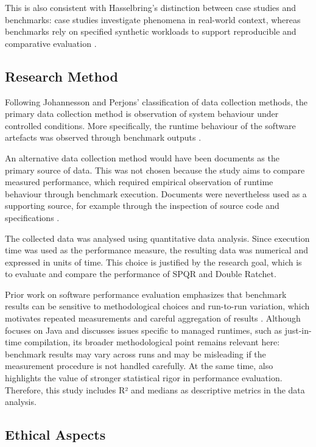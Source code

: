 This is also consistent with Hasselbring's distinction between case studies and benchmarks: case studies investigate phenomena in real-world context, whereas benchmarks rely on specified synthetic workloads to support reproducible and comparative evaluation \cite{ref22}.

\subsection{Research Method}

Following Johannesson and Perjons' classification of data collection methods, the primary data collection method is observation of system behaviour under controlled conditions. More specifically, the runtime behaviour of the software artefacts was observed through benchmark outputs \cite{ref21}.

An alternative data collection method would have been documents as the primary source of data. This was not chosen because the study aims to compare measured performance, which required empirical observation of runtime behaviour through benchmark execution. Documents were nevertheless used as a supporting source, for example through the inspection of source code and specifications \cite{ref21}.

The collected data was analysed using quantitative data analysis. Since execution time was used as the performance measure, the resulting data was numerical and expressed in units of time. This choice is justified by the research goal, which is to evaluate and compare the performance of SPQR and Double Ratchet.

Prior work on software performance evaluation emphasizes that benchmark results can be sensitive to methodological choices and run-to-run variation, which motivates repeated measurements and careful aggregation of results \cite{ref23}. Although \cite{ref23} focuses on Java and discusses issues specific to managed runtimes, such as just-in-time compilation, its broader methodological point remains relevant here: benchmark results may vary across runs and may be misleading if the measurement procedure is not handled carefully. At the same time, \cite{ref23} also highlights the value of stronger statistical rigor in performance evaluation. Therefore, this study includes R² and medians as descriptive metrics in the data analysis.

\subsection{Ethical Aspects}

